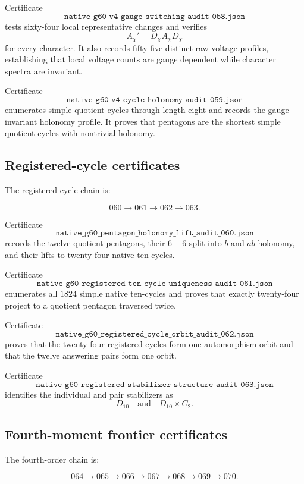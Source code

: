 Certificate
\[
\texttt{native\_g60\_v4\_gauge\_switching\_audit\_058.json}
\]
tests sixty-four local representative changes and verifies
\[
A_\chi'
=
D_\chi A_\chi D_\chi
\]
for every character. It also records fifty-five distinct raw voltage
profiles, establishing that local voltage counts are gauge dependent
while character spectra are invariant.

Certificate
\[
\texttt{native\_g60\_v4\_cycle\_holonomy\_audit\_059.json}
\]
enumerates simple quotient cycles through length eight and records the
gauge-invariant holonomy profile. It proves that pentagons are the
shortest simple quotient cycles with nontrivial holonomy.

\subsection{Registered-cycle certificates}

The registered-cycle chain is:

\[
060
\longrightarrow
061
\longrightarrow
062
\longrightarrow
063.
\]

Certificate
\[
\texttt{native\_g60\_pentagon\_holonomy\_lift\_audit\_060.json}
\]
records the twelve quotient pentagons, their \(6+6\) split into \(b\)
and \(ab\) holonomy, and their lifts to twenty-four native ten-cycles.

Certificate
\[
\texttt{native\_g60\_registered\_ten\_cycle\_uniqueness\_audit\_061.json}
\]
enumerates all \(1824\) simple native ten-cycles and proves that exactly
twenty-four project to a quotient pentagon traversed twice.

Certificate
\[
\texttt{native\_g60\_registered\_cycle\_orbit\_audit\_062.json}
\]
proves that the twenty-four registered cycles form one automorphism
orbit and that the twelve answering pairs form one orbit.

Certificate
\[
\texttt{native\_g60\_registered\_stabilizer\_structure\_audit\_063.json}
\]
identifies the individual and pair stabilizers as
\[
D_{10}
\quad\text{and}\quad
D_{10}\times C_2.
\]

\subsection{Fourth-moment frontier certificates}

The fourth-order chain is:

\[
064
\longrightarrow
065
\longrightarrow
066
\longrightarrow
067
\longrightarrow
068
\longrightarrow
069
\longrightarrow
070.
\]

